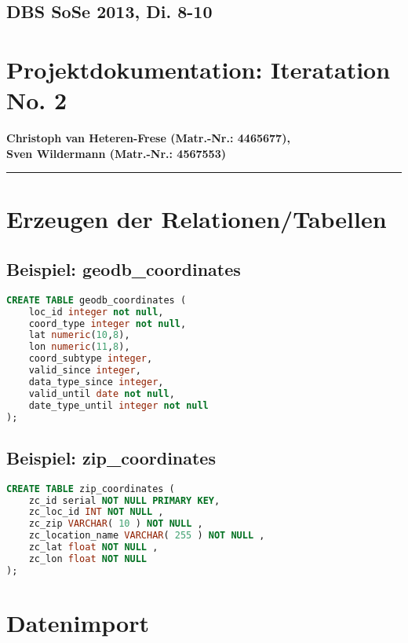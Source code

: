 \documentclass[11pt,a4paper,DIV=10,]{scrartcl}
\begin{document}

\subsection*{DBS SoSe 2013, Di. 8-10}
\section*{Projektdokumentation: Iteratation No. 2}
\textbf{Christoph van Heteren-Frese (Matr.-Nr.: 4465677), \\ Sven Wildermann (Matr.-Nr.: 4567553) }
\hrule
\section*{Erzeugen der Relationen/Tabellen}

\subsection*{Beispiel: geodb\_coordinates}
\begin{lstlisting}[language=sql]
CREATE TABLE geodb_coordinates (
	loc_id integer not null,
	coord_type integer not null,
	lat numeric(10,8),
	lon numeric(11,8),
	coord_subtype integer,
	valid_since integer,
	data_type_since integer,
	valid_until date not null,
	date_type_until integer not null
);
\end{lstlisting}
\subsection*{Beispiel: zip\_coordinates}
\begin{lstlisting}[language=sql]
CREATE TABLE zip_coordinates (
    zc_id serial NOT NULL PRIMARY KEY,
    zc_loc_id INT NOT NULL ,                                            
    zc_zip VARCHAR( 10 ) NOT NULL ,
    zc_location_name VARCHAR( 255 ) NOT NULL ,
    zc_lat float NOT NULL ,
    zc_lon float NOT NULL
);
\end{lstlisting}
\section*{Datenimport}
\end{document}
